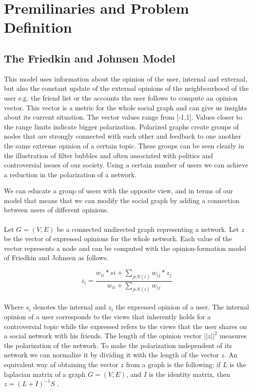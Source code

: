 \chapter{Premilinaries and Problem Definition}
\label{ch:premAndDef}


\section{The Friedkin and Johnsen Model}
\label{sec:prem}

This model uses information about the opinion of the user, internal and external, but also the constant update of the external opinions of the neighbourhood of the user e.g. the friend list or the accounts the user follows
to compute an opinion vector. This vector is a metric for the whole social graph and can give us insights about its current situation. The vector values range from [-1,1]. Values closer to the range limits indicate bigger polarization. Polarized graphs create groups of nodes that are strongly connected with each other and feedback to one another the same extreme opinion of a certain topic. These groups can be seen clearly in the illustration of filter bubbles and often associated with politics and controversial issues of our society. Using a certain number of users we can achieve a reduction in the polarization of a network. 
\clearpage

\noindent We can educate a group of users with the opposite view, and in terms of our model that means that we can modify the social graph by adding a connection between  users of different opinions. \\
\\
Let $G = (V,E)$ be a connected undirected graph representing a network. Let $z$ be the vector of expressed opinions  for the whole network. Each value  of the vector represents a node and can be computed with the opinion-formation model of Friedkin and Johnsen as follows. 

\begin{equation} 
	z_i = \frac{w_{ii}*si + \sum_{j \epsilon N(i) }{w_{ij}*z_j}} {w_{ii} + \sum_{j \epsilon N(i) }{w_{ij}}} 
\end{equation} 
\\

\noindent Where $s_i$ denotes the internal and $z_i$ the expressed opinion of a user. The internal opinion of a user corresponds to the views that inherently holds for a controversial topic while the expressed refers to the views that the user shares on a social network with his friends. The length of the opinion vector $||z|| ^2$ measures  the polarization of the network. To make the polarization  independent of its network we can  normalize it  by dividing  it with the length of the vector $z$. 
An equivalent way of obtaining the vector $z$ from a graph is the following: if $L$ is the laplacian matrix of a graph $G=(V,E)$, and $I$ is the identity matrix, then $z=(L+I)^{-1}S$ \cite{bindel}. 

